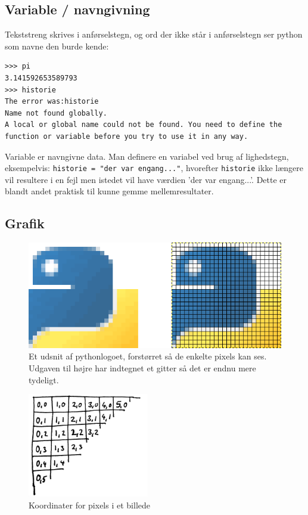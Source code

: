 \documentclass[10pt]{article}
\begin{document}
\subsection{Variable / navngivning}
Tekststreng skrives i anførselstegn, og ord der ikke står i anførselstegn ser python som navne den burde kende:
\begin{verbatim}
>>> pi
3.141592653589793
>>> historie
The error was:historie
Name not found globally.
A local or global name could not be found. You need to define the function or variable before you try to use it in any way.
\end{verbatim}

Variable er navngivne data. Man definere en variabel ved brug af lighedstegn, eksempelvis: \verb|historie = "der var engang..."|, hvorefter \verb|historie| ikke længere vil resultere i en fejl men istedet vil have værdien 'der var engang...'.
Dette er blandt andet praktisk til kunne gemme mellemresultater.

\subsection{Grafik}

\begin{figure}
\begin{center}
\includegraphics[width=350pt]{pixelimage.png}
\end{center}
\caption{Et udsnit af pythonlogoet, forstørret så de enkelte pixels kan ses. Udgaven til højre har indtegnet et gitter så det er endnu mere tydeligt.}
\label{pythonlogoudsnit}
\end{figure}

\begin{figure}
\begin{center}
\includegraphics[width=150pt]{pixelpos.png}
\end{center}
\caption{Koordinater for pixels i et billede}
\label{pixelnummer}
\end{figure}
\end{document}
